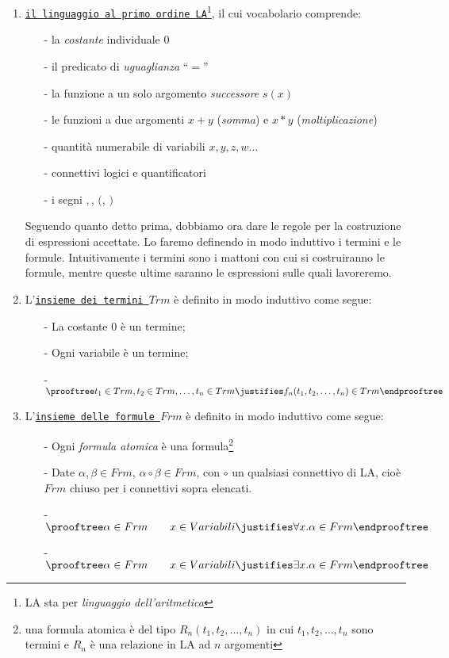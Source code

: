 \begin{enumerate}
 \item \underline{\texttt{il linguaggio al primo ordine LA}}\footnote{LA sta per \textsl{linguaggio dell'aritmetica}}, il cui vocabolario comprende:
\begin{itemize}
	\item [-] la \textsl{costante} individuale $0$
	\item[-] il predicato di \textsl{uguaglianza} "`$=$"' 
	\item[-] la funzione a un solo argomento \textsl{successore} $s(x)$
	\item[-] le funzioni a due argomenti $x+y$ (\textsl{somma}) e $x*y$ (\textsl{moltiplicazione})	
	\item[-] quantit\`a numerabile di variabili $x, y, z, w\ldots$
	\item[-] connettivi logici e quantificatori
	\item[-] i segni $,$, $($, $)$
\end{itemize}
\vspace{.5cm}
Seguendo quanto detto prima, dobbiamo ora dare le regole per la costruzione di espressioni accettate. Lo faremo
definendo in modo induttivo i termini e le formule. Intuitivamente i termini sono i mattoni con cui si costruiranno le formule, mentre queste ultime saranno le espressioni sulle quali lavoreremo.

\item L'\underline{\texttt{insieme dei termini $Trm$}} \`e definito in modo induttivo come segue:
\begin{itemize}
\item[-] La costante $0$ \`e un termine;
\item[-] Ogni variabile \`e un termine;
\vspace{0.3 cm}
\item[-] 
	$\prooftree
  t_1\in Trm ,t_2\in Trm,\dots,t_n\in Trm
   \justifies
f_n(t_1,t_2,\dots,t_n) \in Trm
\endprooftree$ 
\end{itemize}
\vspace{.5cm}
\item  L'\underline{\texttt{insieme delle formule $Frm$}} \`e definito in modo induttivo come segue:
\begin{itemize}
\item[-] Ogni \textit{formula atomica} \`e una formula\footnote{una formula atomica \`e del tipo $R_n(t_1,t_2,\dots,t_n)$ in cui $t_1,t_2,\dots, t_n$ sono termini e $R_n$ \`e una relazione in LA ad $n$ argomenti}
\item[-] Date $\alpha,\beta \in Frm$, $\alpha \circ \beta \in Frm$, con $\circ$ un qualsiasi connettivo di LA, cio\`e $Frm$  chiuso per i connettivi sopra elencati.
\item[-] 
	$\prooftree
  \alpha \in Frm \qquad x \in Variabili
   \justifies
\forall x.\alpha \in Frm
\endprooftree$ 
\vspace{0.3 cm}
\item[-] 
$\prooftree
  \alpha \in Frm \qquad x \in Variabili
   \justifies
\exists x.\alpha \in Frm
\endprooftree$ 


\end{itemize}
\end{enumerate}
